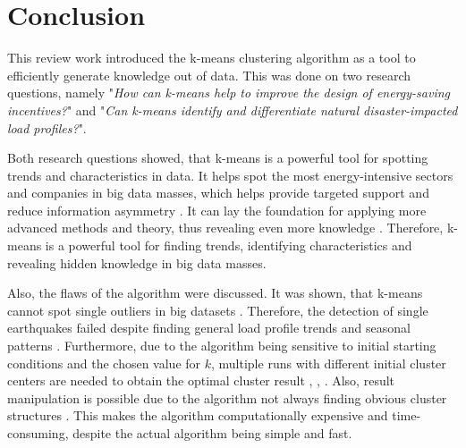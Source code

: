 \chapter{Conclusion}
\label{cha:conclusion}




This review work introduced the k-means clustering algorithm as a tool to efficiently generate knowledge out of data.
This was done on two research questions, namely "\textit{How can k-means help to improve the design of energy-saving incentives?}" and "\textit{Can k-means identify and differentiate natural disaster-impacted load profiles?}".

Both research questions showed, that k-means is a powerful tool for spotting trends and characteristics in data.
It helps spot the most energy-intensive sectors and companies in big data masses, which helps provide targeted support and reduce information asymmetry \cite{LIU-BDE}.
It can lay the foundation for applying more advanced methods and theory, thus revealing even more knowledge \cite{MAL-HBP}.
Therefore, k-means is a powerful tool for finding trends, identifying characteristics and revealing hidden knowledge in big data masses.

Also, the flaws of the algorithm were discussed.
It was shown, that k-means cannot spot single outliers in big datasets \cite{JES-IND}.
Therefore, the detection of single earthquakes failed despite finding general load profile trends and seasonal patterns \cite{JES-IND}.
Furthermore, due to the algorithm being sensitive to initial starting conditions and the chosen value for $k$, multiple runs with different initial cluster centers are needed to obtain the optimal cluster result \cite{JAI-DCB}, \cite{EZU-CPF}, \cite{BAR-LVG}.
Also, result manipulation is possible due to the algorithm not always finding obvious cluster structures \cite{BOU-RPK}.
This makes the algorithm computationally expensive and time-consuming, despite the actual algorithm being simple and fast.

